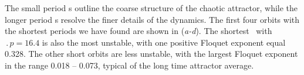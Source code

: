 %
%
%
%

The small period \rpo s outline the coarse structure of the chaotic
attractor, while the longer period \rpo s resolve the finer details
of the dynamics.
The first four orbits with the shortest periods we have found are
shown in (\textit{a-d}).  The shortest \rpo\ with
$\period{p} = 16.4$ is also the most unstable, with one positive
Floquet exponent equal 0.328.  The other short orbits are less
unstable, with the largest Floquet exponent in the range
0.018 -- 0.073, typical of the long time attractor average.

